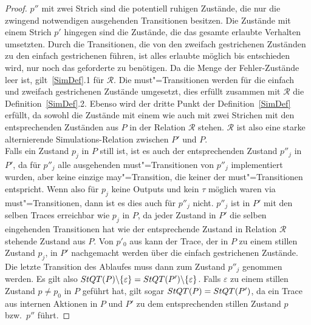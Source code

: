 \begin{proof}
  $p''$ mit zwei Strich sind die potentiell ruhigen Zustände, die nur die
  zwingend notwendigen ausgehenden Transitionen besitzen. Die Zustände mit
  einem Strich $p'$ hingegen sind die Zustände, die das gesamte erlaubte
  Verhalten umsetzten. Durch die Transitionen, die von den zweifach
  gestrichenen Zuständen zu den einfach gestrichenen führen, ist alles erlaubte
  möglich bis entschieden wird, nur noch das geforderte zu benötigen. Da die
  Menge der Fehler-Zustände leer ist, gilt~\ref{SimDef}.1 für $\mathcal{R}$.
  Die must"=Transitionen werden für die einfach und zweifach gestrichenen
  Zustände umgesetzt, dies erfüllt zusammen mit $\mathcal{R}$ die
  Definition~\ref{SimDef}.2. Ebenso wird der dritte Punkt der
  Definition~\ref{SimDef} erfüllt, da sowohl die Zustände mit einem wie auch
  mit zwei Strichen mit den entsprechenden Zuständen aus $P$ in der Relation
  $\mathcal{R}$ stehen. $\mathcal{R}$ ist also eine starke alternierende
  Simulations-Relation zwischen $P'$ und $P$.\\
  Falls ein Zustand $p_j$ in $P$ still ist, ist es auch der entsprechenden
  Zustand $p''_j$ in $P'$, da für $p''_j$ alle ausgehenden must"=Transitionen
  von $p''_j$ implementiert wurden, aber keine einzige may"=Transition, die
  keiner der must"=Transitionen entspricht. Wenn also für $p_j$ keine Outputs
  und kein $\tau$ möglich waren via must"=Transitionen, dann ist es dies auch
  für $p''_j$ nicht. $p''_j$ ist in $P'$ mit den selben Traces erreichbar wie
  $p_j$ in $P$, da jeder Zustand in $P'$ die selben eingehenden Transitionen
  hat wie der entsprechende Zustand in Relation $\mathcal{R}$ stehende Zustand
  aus $P$. Von $p'_0$ aus kann der Trace, der in $P$ zu einem stillen Zustand
  $p_j$, in $P'$ nachgemacht werden über die einfach gestrichenen Zustände. Die
  letzte Transition des Ablaufes muss dann zum Zustand $p''_j$ genommen werden.
  Es gilt also $StQT (P)\backslash \{\varepsilon\} = StQT (P')\backslash
  \{\varepsilon\}$. Falls $\varepsilon$ zu einem stillen Zustand $p \neq p_0$
  in $P$ geführt hat, gilt sogar $StQT(P) = StQT (P')$, da ein Trace aus
  internen Aktionen in $P$ und $P'$ zu dem entsprechenden stillen Zustand $p$
  bzw.\ $p''$ führt.


\end{proof}
